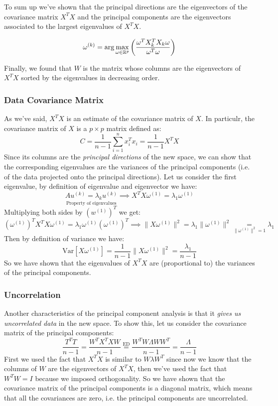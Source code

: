To sum up we've shown that the principal directions are the eigenvectors of the covariance matrix $X^T X$ and the principal components are the eigenvectors associated to the largest eigenvalues of $X^T X$. 

\[
    \omega^{(k)} = \arg \max_{\omega \in \mathbb{R}^p} \left(\frac{\omega^T X_k^T X_k \omega}{\omega^T \omega}\right)
\]

Finally, we found that $W$ is the matrix whose columns are the eigenvectors of $X^T X$ sorted by the eigenvalues in decreasing order.

\subsubsection*{Data Covariance Matrix}
As we've said, $X^TX$ is an estimate of the covariance matrix of $X$. In particulr, the covariance matrix of $X$ is a $p\times p$ matrix defined as:
\[
    C = \frac{1}{n-1} \sum_{i=1}^n x_i^T x_i = \frac{1}{n-1} X^T X
\]
Since its columns are the \textit{principal directions} of the new space, we can show that the corresponding eigenvalues are the variances of the principal components (i.e. of the data projected onto the principal directions).
Let us consider the first eigenvalue, by definition of eigenvalue and eigenvector we have:
\[
    \underset{\text{Property of eigenvalues}}{A u^{(k)} = \lambda_k u^{(k)}} \implies X^T X \omega^{(1)} = \lambda_1 \omega^{(1)}
\]
Multiplying both sides by $(w^{(1)})^T$ we get:
\[
    (\omega^{(1)})^T X^T X \omega^{(1)} = \lambda_1 \omega^{(1)}(\omega^{(1)})^T \implies \|X \omega^{(1)}\|^2 = \lambda_1 \|\omega^{(1)} \|^2 \underset{\|\omega^{(1)}\|^2=1}= \lambda_1
\]
Then by definition of variance we have:
\[
    \text{Var}\left[X \omega^{(1)}\right] = \frac{1}{n-1} \|X \omega^{(1)}\|^2 = \frac{\lambda_1}{n-1}
\]
So we have shown that the eigenvalues of $X^T X$ are (proportional to) the variances of the principal components.

\subsubsection*{Uncorrelation}
Another characteristics of the principal component analysis is that it \textit{gives us uncorrelated data} in the new space. To show this, let us consider the covariance matrix of the principal components:
\[
    \frac{T^T T}{n-1} = \frac{W^T X^T X W}{n-1} \overset{\text{ED}}= \frac{W^T W \Lambda W W^T}{n-1} = \frac{\Lambda}{n-1}
\]
First we used the fact that $X^T X$ is similar to $W \lambda W^T$ since now we know that the columns of $W$ are the eigenvectors of $X^TX$, then we've used the fact that $W^T W = I$ because we imposed orthogonality.
So we have shown that the covariance matrix of the principal components is a diagonal matrix, which means that all the covariances are zero, i.e. the principal components are uncorrelated.

